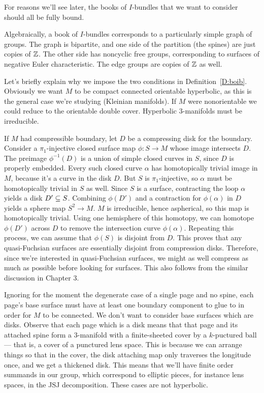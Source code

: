 For reasons we'll see later, the books of $I$-bundles that we want to consider
should all be fully bound.

Algebraically, a book of $I$-bundles corresponds to a particularly simple graph
of groups. The graph is bipartite, and one side of the partition (the spines)
are just copies of $\mathbb{Z}$. The other side has noncyclic free groups,
corresponding to surfaces of negative Euler characteristic. The edge groups are
copies of $\mathbb{Z}$ as well.

Let's briefly explain why we impose the two conditions in
Definition~\ref{D:boib}.  Obviously we want $M$ to be compact connected
orientable hyperbolic, as this is the general case we're studying (Kleinian
manifolds). If $M$ were nonorientable we could reduce to the orientable double
cover. Hyperbolic $3$-manifolds must be irreducible.

If $M$ had compressible boundary, let $D$ be a compressing disk for the
boundary.  Consider a $\pi_1$-injective closed surface map $\phi \colon S \to
M$ whose image intersects $D$. The preimage $\phi^{-1}(D)$ is a union of simple
closed curves in $S$, since $D$ is properly embedded.  Every such closed curve
$\alpha$ has homotopically trivial image in $M$, because it's a curve in the
disk $D$.  But $S$ is $\pi_1$-injective, so $\alpha$ must be homotopically
trivial in $S$ as well.  Since $S$ is a surface, contracting the loop $\alpha$
yields a disk $D'\subseteq S$. Combining $\phi(D')$ and a contraction for
$\phi(\alpha)$ in $D$ yields a sphere map $S^2 \to M$. $M$ is irreducible,
hence aspherical, so this map is homotopically trivial. Using one hemisphere of
this homotopy, we can homotope $\phi(D')$ across $D$ to remove the intersection
curve $\phi(\alpha)$. Repeating this process, we can assume that $\phi(S)$ is
disjoint from $D$. This proves that any quasi-Fuchsian surfaces are essentially
disjoint from compression disks.  Therefore, since we're interested in
quasi-Fuchsian surfaces, we might as well compress as much as possible before
looking for surfaces. This also follows from the similar discussion in Chapter
3.

Ignoring for the moment the degenerate case of a single page and no spine, each
page's base surface must have at least one boundary component to glue to in
order for $M$ to be connected. We don't want to consider base surfaces which
are disks.  Observe that each page which is a disk means that that page and its
attached spine form a $3$-manifold with a finite-sheeted cover by
a $k$-puctured ball --- that is, a cover of a punctured lens space. This is
because we can arrange things so that in the cover, the disk attaching map only
traverses the longitude once, and we get a thickened disk.  This means that
we'll have finite order summands in our group, which correspond to elliptic
pieces, for instance lens spaces, in the JSJ decomposition. These cases are not
hyperbolic.

